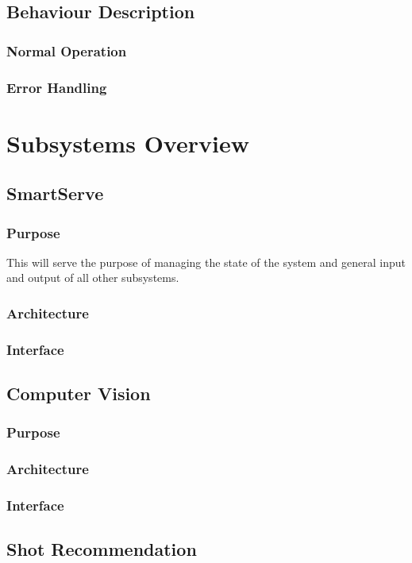 \documentclass[11pt]{article}
\begin{document}
\subsection{Behaviour Description}
\subsubsection{Normal Operation}
\subsubsection{Error Handling}
\section{Subsystems Overview}
\subsection{SmartServe}
\subsubsection*{Purpose}
This will serve the purpose of managing the state of the system and general input and output of all other subsystems. 
\subsubsection*{Architecture}
\subsubsection*{Interface}

\subsection{Computer Vision}
\subsubsection*{Purpose}
\subsubsection*{Architecture}
\subsubsection*{Interface}

\subsection{Shot Recommendation}
\end{document}
